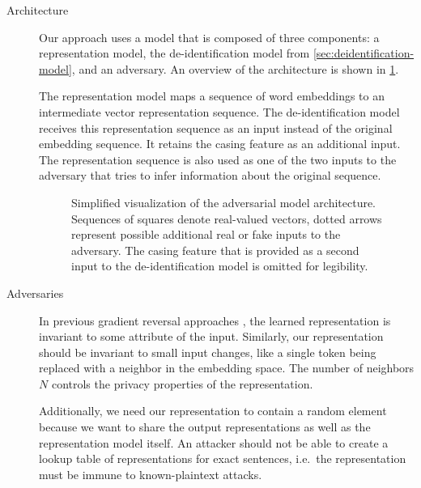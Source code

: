 \begin{description}
    \item[Architecture]
    Our approach uses a model that is composed of three components: a representation model, the de-identification model from \cref{sec:deidentification-model}, and an adversary.
    An overview of the architecture is shown in \cref{fig:adversarial-model}.
    
    The representation model maps a sequence of word embeddings to an intermediate vector representation sequence.
    The de-identification model receives this representation sequence as an input instead of the original embedding sequence.
    It retains the casing feature as an additional input.
    The representation sequence is also used as one of the two inputs to the adversary that tries to infer information about the original sequence.

    \begin{figure}
        \centering
        
        \caption[Adversarial model architecture]{%
            Simplified visualization of the adversarial model architecture.
            Sequences of squares denote real-valued vectors, dotted arrows represent possible additional real or fake inputs to the adversary.
            The casing feature that is provided as a second input to the de-identification model is omitted for legibility.}\label{fig:adversarial-model}
    \end{figure}
    
    \item[Adversaries]
    In previous gradient reversal approaches \citep{ganin2016domain,feutry2018learning,elazar2018adversarial}, the learned representation is invariant to some attribute of the input.
    Similarly, our representation should be invariant to small input changes, like a single token being replaced with a neighbor in the embedding space.
    The number of neighbors $N$ controls the privacy properties of the representation.
    
    Additionally, we need our representation to contain a random element because we want to share the output representations as well as the representation model itself.
    An attacker should not be able to create a lookup table of representations for exact sentences, i.e.\ the representation must be immune to known-plaintext attacks.
    

\end{description}
